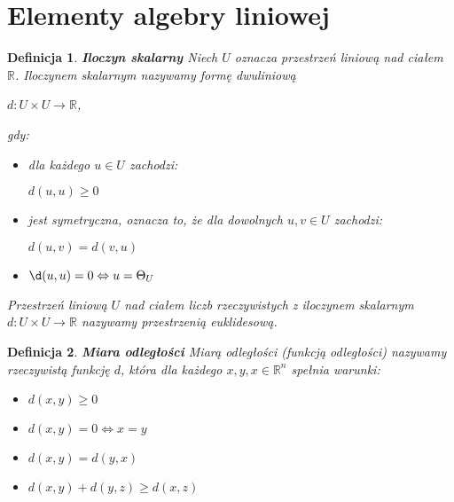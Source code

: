 \documentclass[12pt,a4paper]{report}
\newtheorem{df}{Definicja}[chapter]
\begin{document}
\section{Elementy algebry liniowej}
\begin{df}\textbf{Iloczyn skalarny}
Niech $U$ oznacza przestrzeń liniową nad ciałem $\mathbb{R}$. Iloczynem skalarnym nazywamy formę dwuliniową 
\begin{center}
$d: U \times U \longrightarrow \mathbb{R}$,
\end{center}
gdy:
\begin{itemize}
\item dla każdego $u \in U$ zachodzi:
\begin{center}
$d (u,u) \geq 0$
\end{center}
\item jest symetryczna, oznacza to, że dla dowolnych $u, v \in U$ zachodzi:
\begin{center}
$d(u,v)=d(v,u)$
\end{center}
\item $\d(u,u)=0 \Leftrightarrow u = \Theta_{U}$
\end{itemize}
Przestrzeń liniową $U$ nad ciałem liczb rzeczywistych z iloczynem skalarnym 
$d: U \times U \longrightarrow \mathbb{R}$ nazywamy przestrzenią euklidesową.
\end{df}
\begin{df} \textbf{Miara odległości}
Miarą odległości (funkcją odległości) nazywamy rzeczywistą funkcję $d$, która dla każdego $x, y, x \in \mathbb{R}^n$ spełnia warunki:
\begin{itemize}
\item $d(x,y)\geq 0$ 
\item $d(x,y) = 0 \Leftrightarrow x = y$ 
\item $d(x,y) = d(y,x)$
\item $d(x,y) + d(y,z) \geq d(x,z)$
\end{itemize}
\end{df}
\end{document}
